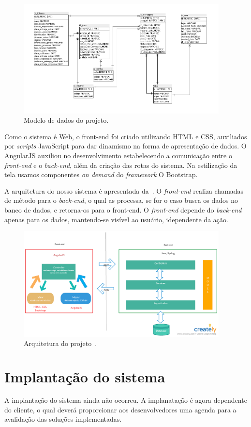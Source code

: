 \begin{figure}
	\includegraphics[width=0.95\textwidth]{figuras/bdAtualizado.png}
	\caption{Modelo de dados do projeto.}
	\label{Figura007}
\end{figure}




Como o sistema é Web, o front-end foi criado utilizando  HTML e CSS, auxiliados por \textit{scripts} JavaScript para dar dinamismo na forma de apresentação de dados.
O AngularJS auxiliou no desenvolvimento estabelecendo a comunicação entre o \textit{front-end} e o \textit{back-end}, além da criação das rotas do sistema.
Na estilização da tela usamos componentes \textit{on demand} do \textit{framework} O Bootstrap.

A arquitetura do nosso sistema é apresentada da~.
O \textit{front-end} realiza chamadas de método para o \textit{back-end}, o qual as processa, se for o caso busca os dados no banco de dados, e retorna-os para o front-end.
O \textit{front-end} depende do \textit{back-end} apenas para os dados, mantendo-se visível ao usuário, idependente da ação.

\begin{figure}[ht]
    \centering
    \includegraphics[width=0.95\textwidth]{figuras/figura005.png}
    \caption{Arquitetura do projeto~\cite{arquitetura}.}
    \label{Figura005}
\end{figure}

\section{Implantação do sistema}

A implantação do sistema ainda não ocorreu.
A implanatação é agora dependente do cliente, o qual deverá proporcionar aos desenvolvedores uma agenda para a avalidação das soluções implementadas.